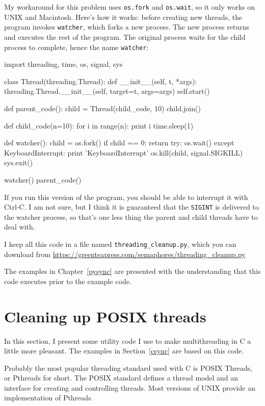 \documentclass{book}
\begin{document}
My workaround for this problem uses {\tt os.fork} and {\tt os.wait},
so it only works on UNIX and Macintosh.  Here's how it works:
before creating new threads, the program invokes {\tt watcher},
which forks a new process.  The new process returns and executes
the rest of the program.  The original process waits for the
child process to complete, hence the name {\tt watcher}:

\begin{unbreakable}[title={The watcher}]{}
import threading, time, os, signal, sys

class Thread(threading.Thread):
 def __init__(self, t, *args):
  threading.Thread.__init__(self, 
   target=t, args=args)
  self.start()

def parent_code():
 child = Thread(child_code, 10)
 child.join()

def child_code(n=10):
 for i in range(n):
  print i
  time.sleep(1)

def watcher():
 child = os.fork()
 if child == 0: return
 try:
  os.wait()
 except KeyboardInterrupt:
  print 'KeyboardInterrupt'
  os.kill(child, signal.SIGKILL)
 sys.exit()

watcher()
parent_code()
\end{unbreakable}

If you run this version of the program, you should be able
to interrupt it with Ctrl-C.  I am not sure, but I think it
is guaranteed that the {\tt SIGINT} is delivered to the
watcher process, so that's one less thing the
parent and child threads have to deal with.

I keep all this code in a file named {\tt threading\_cleanup.py}, which you can download from \url{https://greenteapress.com/semaphores/threading\_cleanup.py}


The examples in Chapter~\ref{pysync} are presented with the understanding
that this code executes prior to the example code.


\chapter{Cleaning up POSIX threads}
\label{ccleanup}

In this section, I present some utility code I use to make
multithreading in C a little more pleasant.  The examples in
Section~\ref{csync} are based on this code.

Probably the most popular threading standard used with C is
POSIX Threads, or Pthreads for short.  The POSIX standard defines
a thread model and an interface for creating and controlling
threads.  Most versions of UNIX provide an implementation of
Pthreads.
\end{document}
